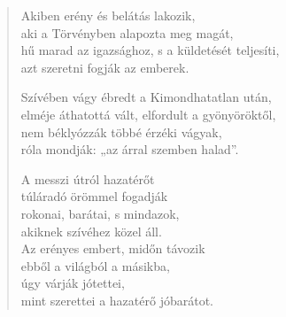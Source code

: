 \begin{verse}
 Akiben erény és belátás lakozik,\\
aki a Törvényben alapozta meg magát,\\
hű marad az igazsághoz, s a küldetését teljesíti,\\
azt szeretni fogják az emberek.

 Szívében vágy ébredt a Kimondhatatlan után,\\
elméje áthatottá vált, elfordult a gyönyöröktől,\\
nem béklyózzák többé érzéki vágyak,\\
róla mondják: „az árral szemben halad”.

 A messzi útról hazatérőt\\
túláradó örömmel fogadják\\
rokonai, barátai, s mindazok,\\
akiknek szívéhez közel áll.\\
Az erényes embert, midőn távozik\\
ebből a világból a másikba,\\
úgy várják jótettei,\\
mint szerettei a hazatérő jóbarátot.

\end{verse}

